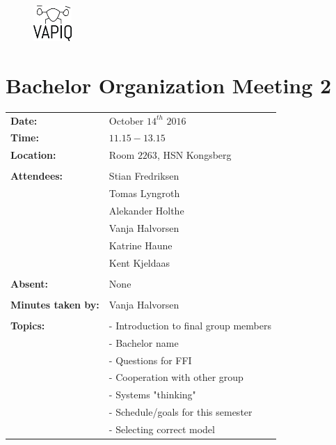 \documentclass{article}
\begin{document}
\begin{figure}
\begin{center}
\includegraphics[width=0.13\textwidth]{VAPIQ-PICTURES/Logo2_Tilted.png} %
\advance{}
\end{center}
\end{figure}

\section*{Bachelor Organization Meeting 2}   

\begin{tabular}{ll}                                         
\textbf{Date:} 	            & October $14^{th}$ $2016$	    \\
\textbf{Time:}	        	& $11.15-13.15$				    \\
\textbf{Location:}       	& Room $2263$, HSN Kongsberg    \\\\
\textbf{Attendees:}         & Stian Fredriksen			    \\
				        	& Tomas Lyngroth			    \\  
				        	& Alekander Holthe 		    	\\
				        	& Vanja Halvorsen		    	\\
				        	& Katrine Haune 		    	\\
				        	& Kent Kjeldaas                 \\\\
\textbf{Absent:}		    & None 						    \\\\
\textbf{Minutes taken by:}	& Vanja Halvorsen		        \\\\
\textbf{Topics:}	        & - Introduction to final group members \\ 
                            & - Bachelor name 			            \\
				        	& - Questions for FFI                   \\  
				        	& - Cooperation with other group        \\
				        	& - Systems "thinking"	    	        \\
				        	& - Schedule/goals for this semester    \\
				        	& - Selecting correct model             \\
\end{tabular}                                                       \\\\\\
\end{document}
